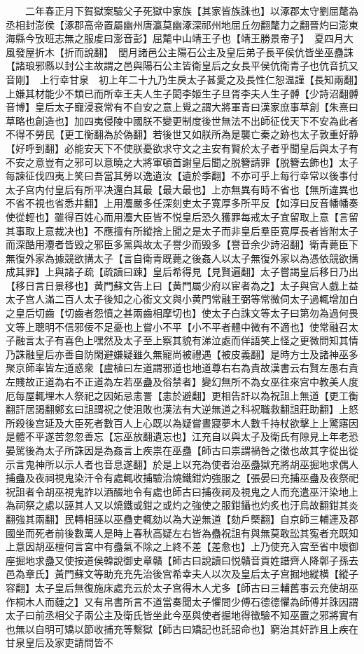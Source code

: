 　　二年春正月下賀獄案驗父子死獄中家族【其家皆族誅也】以涿郡太守劉屈氂為丞相封澎侯【涿郡高帝置屬幽州唐瀛莫幽涿深祁州地屈丘勿翻氂力之翻晉灼曰澎東海縣今攷班志無之服䖍曰澎音彭】屈氂中山靖王子也【靖王勝景帝子】　夏四月大風發屋折木【折而說翻】　閏月諸邑公主陽石公主及皇后弟子長平侯伉皆坐巫蠱誅【諸琅邪縣以封公主故謂之邑與陽石公主皆衛皇后之女長平侯伉衛青子也伉音抗又音剛】　上行幸甘泉　初上年二十九乃生戾太子甚愛之及長性仁恕温謹【長知兩翻】上嫌其材能少不類已而所幸王夫人生子閎李姬生子旦胥李夫人生子髆【少詩沼翻髆音博】皇后太子寵浸衰常有不自安之意上覺之謂大將軍青曰漢家庶事草創【朱熹曰草略也創造也】加四夷侵陵中國朕不變更制度後世無法不出師征伐天下不安為此者不得不勞民【更工衡翻為於偽翻】若後世又如朕所為是襲亡秦之跡也太子敦重好静【好呼到翻】必能安天下不使朕憂欲求守文之主安有賢於太子者乎聞皇后與太子有不安之意豈有之邪可以意曉之大將軍頓首謝皇后聞之脱簪請罪【脱簪去飾也】太子每諫征伐四夷上笑曰吾當其勞以逸遺汝【遺於季翻】不亦可乎上每行幸常以後事付太子宫内付皇后有所平决還白其最【最大最也】上亦無異有時不省也【無所違異也不省不視也省悉井翻】上用灋嚴多任深刻吏太子寛厚多所平反【如淳曰反音幡幡奏使從輕也】雖得百姓心而用灋大臣皆不悦皇后恐久獲罪每戒太子宜留取上意【言留其事取上意裁决也】不應擅有所縱捨上聞之是太子而非皇后羣臣寛厚長者皆附太子而深酷用灋者皆毁之邪臣多黨與故太子譽少而毁多【譽音余少詩沼翻】衛青薨臣下無復外家為據競欲搆太子【言自衛青既薨之後姦人以太子無復外家以為憑依競欲搆成其罪】上與諸子疏【疏讀曰踈】皇后希得見【見賢遍翻】太子嘗謁皇后移日乃出【移日言日景移也】黄門蘇文告上曰【黄門屬少府以宦者為之】太子與宫人戲上益太子宫人滿二百人太子後知之心銜文文與小黄門常融王弼等常微伺太子過輒增加白之皇后切齒【切齒者怨憤之甚兩齒相摩切也】使太子白誅文等太子曰第勿為過何畏文等上聰明不信邪佞不足憂也上嘗小不平【小不平者體中微有不適也】使常融召太子融言太子有喜色上嘿然及太子至上察其貌有涕泣處而佯語笑上怪之更微問知其情乃誅融皇后亦善自防閑避嫌疑雖久無寵尚被禮遇【被皮義翻】是時方士及諸神巫多聚京師率皆左道惑衆【盧植曰左道謂邪道也地道尊右右為貴故漢書云右賢左愚右貴左賤故正道為右不正道為左若巫蠱及俗禁者】變幻無所不為女巫往來宫中教美人度厄每屋輒埋木人祭祀之因妬忌恚詈【恚於避翻】更相告訐以為祝詛上無道【更工衡翻訐居謁翻鄭玄曰詛謂祝之使沮敗也漢法有大逆無道之科祝職救翻詛莊助翻】上怒所殺後宫延及大臣死者數百人上心既以為疑嘗晝寢夢木人數千持杖欲擊上上驚寤因是體不平遂苦忽忽善忘【忘巫放翻遺忘也】江充自以與太子及衛氏有隙見上年老恐晏駕後為太子所誅因是為姦言上疾祟在巫蠱【師古曰祟謂禍咎之徵也故其字從出從示言鬼神所以示人者也音息遂翻】於是上以充為使者治巫蠱獄充將胡巫掘地求偶人捕蠱及夜祠視鬼染汗令有處輒收捕驗治燒鐵鉗灼強服之【張晏曰充捕巫蠱及夜祭祀祝詛者令胡巫視鬼詐以酒醊地令有處也師古曰捕夜祠及視鬼之人而充遣巫汗染地上為祠祭之處以誣其人又以燒鐵或鉗之或灼之強使之服鉗鑷也灼炙也汙烏故翻鉗其炎翻強其兩翻】民轉相誣以巫蠱吏輒劾以為大逆無道【劾戶槩翻】自京師三輔連及郡國坐而死者前後數萬人是時上春秋高疑左右皆為蠱祝詛有與無莫敢訟其寃者充既知上意因胡巫檀何言宮中有蠱氣不除之上終不差【差愈也】上乃使充入宫至省中壞御座掘地求蠱又使按道侯韓說御史章贛【師古曰說讀曰悦贛音貢姓譜齊人降鄣子孫去邑為章氏】黃門蘇文等助充充先治後宫希幸夫人以次及皇后太子宫掘地縱横【縱子容翻】太子皇后無復施床處充云於太子宫得木人尤多【師古曰三輔舊事云充使胡巫作桐木人而薶之】又有帛書所言不道當奏聞太子懼問少傅石德德懼為師傅并誅因謂太子曰前丞相父子兩公主及衛氏皆坐此今巫與使者掘地得徵驗不知巫置之邪將實有也無以自明可矯以節收捕充等繫獄【師古曰矯記也託詔命也】窮治其奸詐且上疾在甘泉皇后及家吏請問皆不